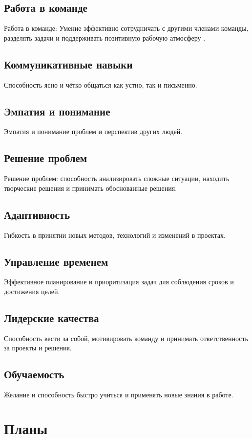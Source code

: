 \documentclass[variant=practice]{bsuir}
\begin{document}
\subsection{Работа в команде} Работа в команде: Умение эффективно сотрудничать с
другими членами команды, разделять задачи и поддерживать позитивную рабочую
атмосферу \cite{devops-mts}.

\subsection{Коммуникативные навыки} Способность ясно и чётко общаться как устно,
так и письменно.

\subsection{Эмпатия и понимание} Эмпатия и понимание проблем и перспектив других
людей.

\subsection{Решение проблем} Решение проблем: способность анализировать сложные
ситуации, находить творческие решения и принимать обоснованные решения.

\subsection{Адаптивность} Гибкость в принятии новых методов, технологий и
изменений в проектах.

\subsection{Управление временем} Эффективное планирование и приоритизация задач
для соблюдения сроков и достижения целей.

\subsection{Лидерские качества} Способность вести за собой, мотивировать команду
и принимать ответственность за проекты и решения.

\subsection{Обучаемость} Желание и способность быстро учиться и применять новые
знания в работе.

\section{Планы}
\end{document}
